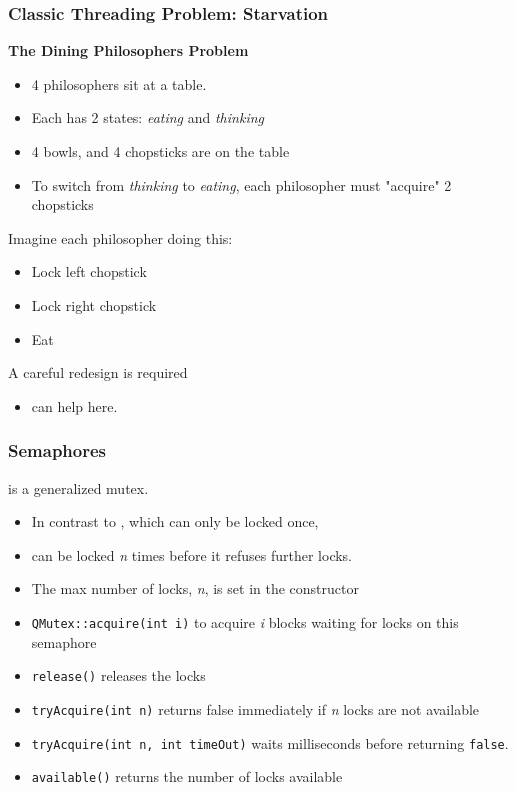 \begin{slide}
\frametitle{Classic Threading Problem: Starvation}

\textbf{The Dining Philosophers Problem}
\begin{itemize}
\item 4 philosophers sit at a table.
\item Each has 2 states: \textit{eating} and \textit{thinking}
\item 4 bowls, and 4 chopsticks are on the table
\item To switch from \textit{thinking} to \textit{eating},
      each philosopher must "acquire" 2 chopsticks
\end{itemize}
Imagine each philosopher doing this:
\begin{itemize}
\item  Lock left chopstick
\item  Lock right chopstick
\item  Eat
\end{itemize}

A careful redesign is required
\begin{itemize}
\item {} can help here.
\end{itemize}
\end{slide}

\begin{slide}
\frametitle{Semaphores}

 is a generalized mutex.
\begin{itemize}
\item In contrast to , which can only be locked once,
\item {} can be locked \textit{n} times before it refuses further
locks.
\item The max number of locks, \textit{n}, is set in the constructor
\item \texttt{QMutex::acquire(int i)} to acquire \textit{i} blocks waiting for
locks on this semaphore
\item \texttt{release()} releases the locks
\item \texttt{tryAcquire(int n)} returns false immediately if \textit{n} locks
are not available
\item \texttt{tryAcquire(int n, int timeOut)} waits milliseconds before
returning \texttt{false}.
\item \texttt{available()} returns the number of locks available
\end{itemize}
\end{slide}

